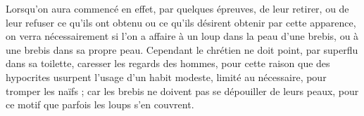 Lorsqu'on aura commencé en effet, par quelques épreuves, de leur retirer, ou de leur refuser ce qu’ils ont obtenu ou ce qu’ils désirent obtenir par cette apparence, on verra nécessairement si l’on a affaire à un loup dans la peau d’une brebis, ou à une brebis dans sa propre peau. Cependant le chrétien ne doit point, par superflu dans sa toilette, caresser les regards des hommes, pour cette raison que des hypocrites usurpent l’usage d’un habit modeste, limité au nécessaire, pour tromper les naïfs ; car les brebis ne doivent pas se dépouiller de leurs peaux, pour ce motif que parfois les loups s’en couvrent.
